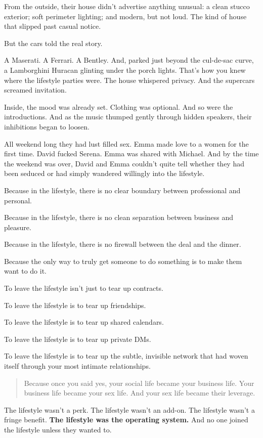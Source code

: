 From the outside, their house didn’t advertise anything unusual: a clean stucco exterior; soft perimeter lighting; and modern, 
but not loud. The kind of house that slipped past casual notice.

But the cars told the real story.

A Maserati. A Ferrari. A Bentley. And, parked just beyond the cul-de-sac curve, a Lamborghini Huracan glinting under the porch 
lights.
That’s how you knew where the lifestyle parties were. The house whispered privacy. And the supercars screamed invitation.

Inside, the mood was already set. Clothing was optional. And so were the introductions.
And as the music thumped gently through hidden speakers, their inhibitions began to loosen.

All weekend long they had lust filled sex.  Emma made love to a women for the first time.  David 
fucked Serena.  Emma was shared with Michael.  And by the time the weekend was over, David and 
Emma couldn’t quite tell whether they had been seduced or had simply wandered willingly into the lifestyle.


Because in the lifestyle, there is no clear boundary between professional and personal.  

Because in the lifestyle, there is no clean separation between business and pleasure.  

Because in the lifestyle, there is no firewall between the deal and the dinner.

Because the only way to truly get someone to do something is to make them want to do it.

To leave the lifestyle isn’t just to tear up contracts.

To leave the lifestyle is to tear up friendships.  

To leave the lifestyle is to tear up shared calendars.  

To leave the lifestyle is to tear up private DMs.  

To leave the lifestyle is to tear up the subtle, invisible network that had woven itself through your 
most intimate relationships.

\begin{quote}
Because once you said yes,  
your social life became your business life.  
Your business life became your sex life.  
And your sex life became their leverage.
\end{quote}

The lifestyle wasn’t a perk.
The lifestyle wasn’t an add-on.
The lifestyle wasn’t a fringe benefit.
\textbf{The lifestyle was the operating system.}
And no one joined the lifestyle unless they wanted to.

